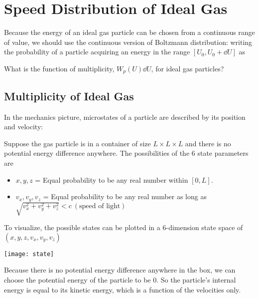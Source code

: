 \documentclass[class=article, crop=false, 12pt]{standalone}
\begin{document}
\linesep
\section{Speed Distribution of Ideal Gas}

Because the energy of an ideal gas particle can be chosen from a continuous range of value,
we should use the continuous version of Boltzmann distribution:
writing the probability of a particle acquiring an energy in the range $[U_0,U_0+\dd{U}]$ as

What is the function of multiplicity, $W_p(U)\dd{U}$, for ideal gas particles?



\subsection{Multiplicity of Ideal Gas}

In the mechanics picture,
microstates of a particle are described by its position and velocity:

Suppose the gas particle is in a container of size $L\times L \times L$ and 
there is no potential energy difference anywhere.
The possibilities of the 6 state parameters are
\begin{itemize}
    \item $x,y,z$ = Equal probability to be any real number within $[0,L]$.
    
    \item $v_x,v_y,v_z$ = Equal probability to be any real number as long as 
    $\sqrt{v_x^2+v_y^2+v_z^2}<c{\ \scriptstyle (\text{speed of light})}$
    
\end{itemize} 

To visualize, the possible states can be plotted in a 6-dimension state space of $(x,y,z, v_x, v_y, v_z)$ 

\begin{center}
    \begin{minipage}{0.8\linewidth}
        \centering
        \texttt{[image: state]}
    \end{minipage}
\end{center}


Because there is no potential energy difference anywhere in the box,
we can choose the potential energy of the particle to be $0$.
So the particle's internal energy is equal to its kinetic energy, which is a function of the velocities only.
\end{document}
